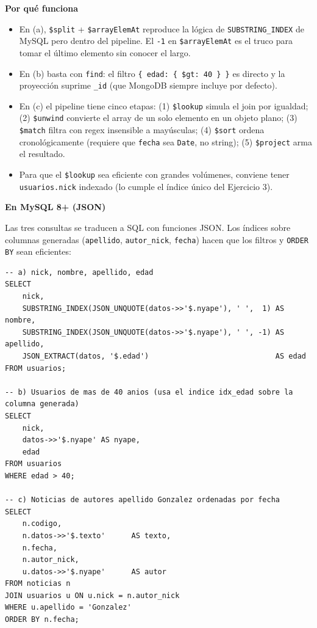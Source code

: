 \documentclass[11pt,a4paper]{article}
\newcommand{\itemcabecera}[1]{\noindent\textbf{#1}\par\medskip}
\newcommand{\bloquePorque}{\itemcabecera{Por qu\'e funciona}}
\newcommand{\bloqueMySQL}{\itemcabecera{En MySQL 8+ (JSON)}}
\begin{document}
\bloquePorque

\begin{itemize}
    \item En (a), \texttt{\$split} + \texttt{\$arrayElemAt} reproduce la lógica de \texttt{SUBSTRING\_INDEX} de MySQL pero dentro del pipeline. El \texttt{-1} en \texttt{\$arrayElemAt} es el truco para tomar el último elemento sin conocer el largo.
    \item En (b) basta con \texttt{find}: el filtro \texttt{\{ edad: \{ \$gt: 40 \} \}} es directo y la proyección suprime \texttt{\_id} (que MongoDB siempre incluye por defecto).
    \item En (c) el pipeline tiene cinco etapas: (1) \texttt{\$lookup} simula el join por igualdad; (2) \texttt{\$unwind} convierte el array de un solo elemento en un objeto plano; (3) \texttt{\$match} filtra con regex insensible a mayúsculas; (4) \texttt{\$sort} ordena cronológicamente (requiere que \texttt{fecha} sea \texttt{Date}, no string); (5) \texttt{\$project} arma el resultado.
    \item Para que el \texttt{\$lookup} sea eficiente con grandes volúmenes, conviene tener \texttt{usuarios.nick} indexado (lo cumple el índice único del Ejercicio 3).
\end{itemize}

\bloqueMySQL

Las tres consultas se traducen a SQL con funciones JSON. Los índices sobre columnas generadas (\texttt{apellido}, \texttt{autor\_nick}, \texttt{fecha}) hacen que los filtros y \texttt{ORDER BY} sean eficientes:

\begin{lstlisting}[style=sqlstyle]
-- a) nick, nombre, apellido, edad
SELECT
    nick,
    SUBSTRING_INDEX(JSON_UNQUOTE(datos->>'$.nyape'), ' ',  1) AS nombre,
    SUBSTRING_INDEX(JSON_UNQUOTE(datos->>'$.nyape'), ' ', -1) AS apellido,
    JSON_EXTRACT(datos, '$.edad')                             AS edad
FROM usuarios;

-- b) Usuarios de mas de 40 anios (usa el indice idx_edad sobre la columna generada)
SELECT
    nick,
    datos->>'$.nyape' AS nyape,
    edad
FROM usuarios
WHERE edad > 40;

-- c) Noticias de autores apellido Gonzalez ordenadas por fecha
SELECT
    n.codigo,
    n.datos->>'$.texto'      AS texto,
    n.fecha,
    n.autor_nick,
    u.datos->>'$.nyape'      AS autor
FROM noticias n
JOIN usuarios u ON u.nick = n.autor_nick
WHERE u.apellido = 'Gonzalez'
ORDER BY n.fecha;
\end{lstlisting}
\end{document}
